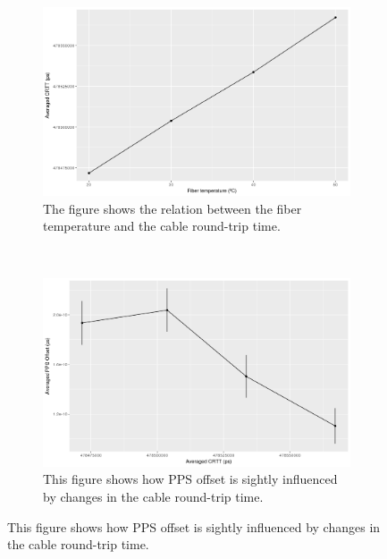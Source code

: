 \begin{figure}
	\centering
	\begin{subfigure}[t]{0.48\textwidth}
		\includegraphics[width=\textwidth]{img/crttvstemp}
		\caption[CRTT vs. Fiber temperature]{The figure shows the relation 
		between the fiber temperature and the cable round-trip time.}
		\label{fig:crttvstemp}
	\end{subfigure}
	~ %
	\begin{subfigure}[t]{0.48\textwidth}
		\includegraphics[width=\textwidth]{img/ppsvscrtt}
		\caption[PPS offset vs. CRTT]{This figure shows how PPS offset is 
		sightly influenced by changes in the cable round-trip time.}
		\label{fig:ppsvscrtt}
	\end{subfigure}
\end{figure}
